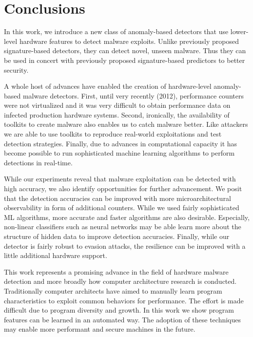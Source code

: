 \documentclass{acm_proc_article-sp}
\begin{document}
\section{Conclusions}
\label{sec:conclusion}

In this work, we introduce a new class of anomaly-based detectors
that use lower-level hardware features to detect malware exploits.
Unlike previously proposed signature-based detectors, they can detect
novel, unseen malware.  Thus they can be used in concert with
previously proposed signature-based predictors to better security.

A whole host of advances have enabled the creation of hardware-level anomaly-based
malware detectors. First, until very recently (2012), performance
counters were not virtualized and it was very difficult to obtain
performance data on infected production hardware systems. Second,
ironically, the availability of toolkits to create malware also
enables us to catch malware better. Like attackers we are able to
use toolkits to reproduce real-world exploitations and test detection
strategies. Finally, due to advances in computational capacity it
has become possible to run sophisticated machine learning algorithms
to perform detections in real-time.

While our experiments reveal that malware exploitation can be
detected with high accuracy, we also identify opportunities for
further advancement. We posit that the detection accuracies can be
improved with more microarchitectural observability in form of
additional counters. While we used fairly sophisticated ML algorithms,
more accurate and faster algorithms are also desirable.  Especially,
non-linear classifiers such as neural networks may be able learn
more about the structure of hidden data to improve detection
accuracies. Finally, while our detector is fairly robust to evasion
attacks, the resilience can be improved with a little additional
hardware support.

This work represents a promising advance in the field of hardware
malware detection and more broadly how computer architecture research
is conducted.  Traditionally computer architects have aimed to
manually learn program characteristics to exploit common behaviors
for performance. The effort is made difficult due to program diversity
and growth.  In this work we show program features can be learned
in an automated way. The adoption of these techniques may enable
more performant and secure machines in the future.




\end{document}
